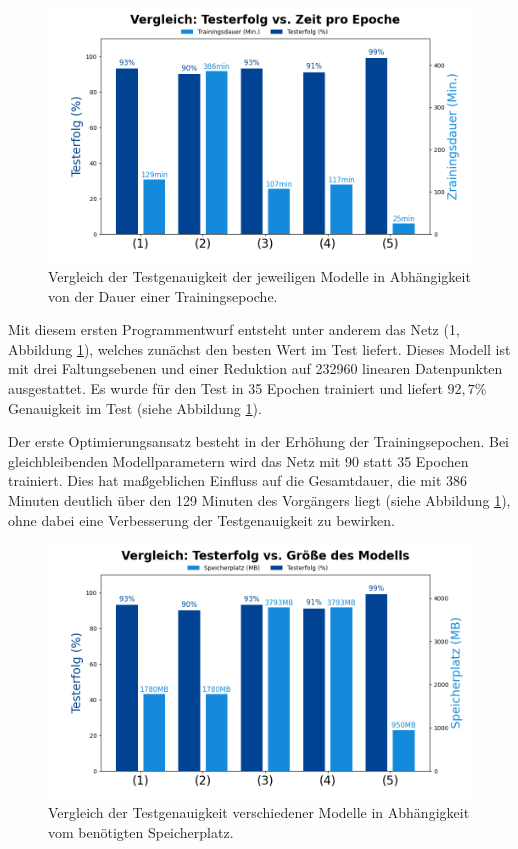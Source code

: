 \documentclass[journal,twoside,web]{ieeecolor}
\begin{document}
\begin{figure}[H]
    \centerline{\includegraphics[width=\columnwidth]{Erfolg_Dauerv2.png}}
    \caption{Vergleich der Testgenauigkeit der jeweiligen Modelle in Abhängigkeit von der Dauer einer Trainingsepoche.}
    \label{fig:compareGraph}
\end{figure}

Mit diesem ersten Programmentwurf entsteht unter anderem das Netz (1, Abbildung \ref{fig:compareGraph}), welches zunächst den besten Wert im Test liefert. Dieses Modell ist mit drei Faltungsebenen und einer Reduktion auf 232960 linearen Datenpunkten ausgestattet.
Es wurde für den Test in 35 Epochen trainiert und liefert $92,7\%$ Genauigkeit im Test (siehe Abbildung \ref{fig:compareGraph}).

Der erste Optimierungsansatz besteht in der Erhöhung der Trainingsepochen. Bei gleichbleibenden Modellparametern wird das Netz mit 90 statt 35 Epochen trainiert. Dies hat maßgeblichen Einfluss auf die Gesamtdauer, die mit 386 Minuten deutlich über den 129 Minuten des Vorgängers liegt (siehe Abbildung \ref{fig:compareGraph}), ohne dabei eine Verbesserung der Testgenauigkeit zu bewirken.

\begin{figure}[H]
    \centerline{\includegraphics[width=\columnwidth]{Erfolg_Groessev2.png}}
    \caption{Vergleich der Testgenauigkeit verschiedener Modelle in Abhängigkeit vom benötigten Speicherplatz.}
    \label{fig:compareSize}
\end{figure}
\end{document}
